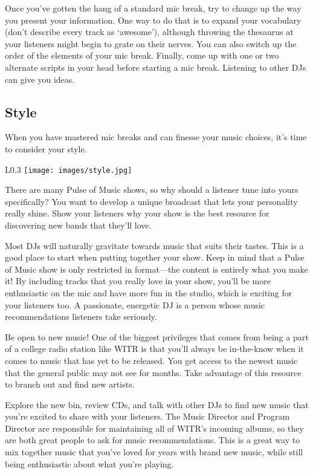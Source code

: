 \documentclass{witrman}
\begin{document}
Once you've gotten the hang of a standard mic break, try to change up the way
you present your information.  One way to do that is to expand your vocabulary
(don't describe every track as `awesome'), although throwing the thesaurus at
your listeners might begin to grate on their nerves.  You can also switch up the
order of the elements of your mic break.  Finally, come up with one or two
alternate scripts in your head before starting a mic break.  Listening to other
DJs can give you ideas.


\subsection{Style}

When you have mastered mic breaks and can finesse your music choices, it's time
to consider your style.

\begin{wrapfigure}{L}{0.3\linewidth}
    \texttt{[image: images/style.jpg]}
\end{wrapfigure}

There are many Pulse of Music shows, so why should a listener tune into yours
specifically?  You want to develop a unique broadcast that lets your personality
really shine.  Show your listeners why your show is the best resource for
discovering new bands that they'll love.

Most DJs will naturally gravitate towards music that suits their tastes.  This
is a good place to start when putting together your show.  Keep in mind that a
Pulse of Music show is only restricted in format---the content is entirely what
you make it!  By including tracks that you really love in your show, you'll be
more enthusiastic on the mic and have more fun in the studio, which is exciting
for your listeners too.  A passionate, energetic DJ is a person whose music
recommendations listeners take seriously.

Be open to new music!  One of the biggest privileges that comes from being a
part of a college radio station like WITR is that you'll always be in-the-know
when it comes to music that has yet to be released.  You get access to the
newest music that the general public may not see for months.  Take advantage of
this resource to branch out and find new artists.

Explore the new bin, review CDs, and talk with other DJs to find new music that
you're excited to share with your listeners.   The Music Director and Program
Director are responsible for maintaining all of WITR's incoming albums, so they
are both great people to ask for music recommendations.  This is a great way to
mix together music that you've loved for years with brand new music, while still
being enthusiastic about what you're playing.
\end{document}
